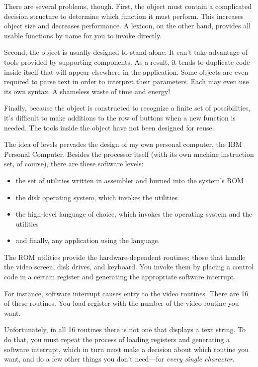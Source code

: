 There are several problems, though. First, the object must contain a
complicated decision structure to determine which function it must
perform. This increases object size and decreases performance. A
lexicon, on the other hand, provides all usable functions by name for
you to invoke directly.

Second, the object is usually designed to stand alone. It can't take
advantage of tools provided by supporting components. As a result, it
tends to duplicate code inside itself that will appear elsewhere in
the application. Some objects are even required to parse text in order
to interpret their parameters. Each may even use its own syntax. A
shameless waste of time and energy!


Finally, because the object is constructed to recognize a finite set
of possibilities, it's difficult to make additions to the row of
buttons when a new function is needed. The tools inside the object
have not been designed for reuse.%

The idea of levels pervades the design of my own personal computer,
the IBM Personal Computer. Besides the processor itself (with its own
machine instruction set, of course), there are these software levels:

\begin{itemize}
	\item the set of utilities written in assembler and burned into the system's ROM
	\item the disk operating system, which invokes the utilities
	\item the high-level language of choice, which invokes the operating system and
	the utilities
	\item and finally, any application using the language.
\end{itemize}

\noindent The ROM utilities provide the hardware-dependent routines:
those that handle the video screen, disk drives, and keyboard. You
invoke them by placing a control code in a certain register and
generating the appropriate software interrupt.

For instance, software interrupt  causes entry to the video
routines. There are 16 of these routines. You load register  with the
number of the video routine you want.

Unfortunately, in all 16 routines there is not one that displays a text
string. To do that, you must repeat the process of loading registers and
generating a software interrupt, which in turn must make a decision
about which routine you want, and do a few other things you don't
need---for \emph{every single character}.

